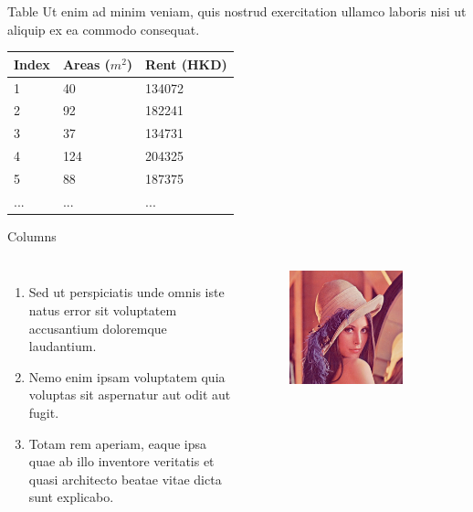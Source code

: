 \documentclass{beamer}
\begin{document}
\begin{frame}{Table}
    Ut enim ad minim veniam, quis nostrud exercitation ullamco laboris nisi ut aliquip ex ea commodo consequat.
    \vspace{0.4in}
    \begin{table}
        \footnotesize
        \begin{tabular}{l | l | l}
        Index & Areas ($m^2$) & Rent (HKD) \\
        \hline \hline
        1 & 40 & 134072 \\ 
        2 & 92 & 182241 \\
        3 & 37 & 134731 \\
        4 & 124 & 204325 \\
        5 & 88 & 187375 \\
        ... & ... & ...
        \end{tabular}
    \end{table}
\end{frame}


\begin{frame}{Columns}
    \begin{columns}
        \begin{enumerate}
            \item Sed ut perspiciatis unde omnis iste natus error sit voluptatem accusantium doloremque laudantium.
            \item Nemo enim ipsam voluptatem quia voluptas sit aspernatur aut odit aut fugit.
            \item Totam rem aperiam, eaque ipsa quae ab illo inventore veritatis et quasi architecto beatae vitae dicta sunt explicabo.
        \end{enumerate}
        \begin{figure}
            \includegraphics[width=0.8\textwidth]{images/lenna.jpg}
        \end{figure}
    \end{columns}
\end{frame}
\end{document}
